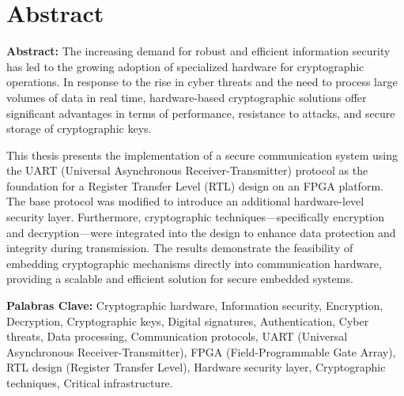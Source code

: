 \chapter{Abstract}

\textbf{Abstract:} 
The increasing demand for robust and efficient information security has led to the growing adoption of specialized hardware for cryptographic operations. In response to the rise in cyber threats and the need to process large volumes of data in real time, hardware-based cryptographic solutions offer significant advantages in terms of performance, resistance to attacks, and secure storage of cryptographic keys.

This thesis presents the implementation of a secure communication system using the UART (Universal Asynchronous Receiver-Transmitter) protocol as the foundation for a Register Transfer Level (RTL) design on an FPGA platform. The base protocol was modified to introduce an additional hardware-level security layer. Furthermore, cryptographic techniques—specifically encryption and decryption—were integrated into the design to enhance data protection and integrity during transmission. The results demonstrate the feasibility of embedding cryptographic mechanisms directly into communication hardware, providing a scalable and efficient solution for secure embedded systems.





\textbf{Palabras Clave:} Cryptographic hardware, Information security, Encryption, Decryption, Cryptographic keys, Digital signatures, Authentication, Cyber threats, Data processing, Communication protocols, UART (Universal Asynchronous Receiver-Transmitter), FPGA (Field-Programmable Gate Array), RTL design (Register Transfer Level), Hardware security layer, Cryptographic techniques, Critical infrastructure.\\


\endinput 